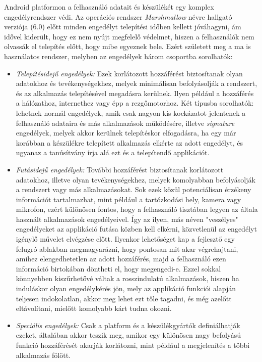 Android platformon a felhasználó adatait és készülékét egy komplex engedélyrendszer védi. Az operációs rendszer \emph{Marshmallow} névre hallgató verziója (6.0) előtt minden engedélyt telepítési időben kellett jóváhagyni, ám idővel kiderült, hogy ez nem nyújt megfelelő védelmet, hiszen a felhasználók nem olvassák el telepítés előtt, hogy mibe egyeznek bele. Ezért született meg a ma is használatos rendszer, melyben az engedélyek három csoportba sorolhatók:
\begin{itemize}
	\item \emph{Telepítésidejű engedélyek:} Ezek korlátozott hozzáférést biztosítanak olyan adatokhoz és tevékenységekhez, melyek minimálisan befolyásolják a rendszert, és az alkalmazás telepítésével megadásra kerülnek. Ilyen például a hozzáférés a hálózathoz, internethez vagy épp a rezgőmotorhoz. Két típusba sorolhatók: lehetnek normál engedélyek, amik csak nagyon kis kockázatot jelentenek a felhasználó adataira és más alkalmazások működésére, illetve \emph{signature} engedélyek, melyek akkor kerülnek telepítéskor elfogadásra, ha egy már korábban a készülékre telepített alkalmazás elkérte az adott engedélyt, és ugyanaz a tanúsítvány írja alá ezt és a telepítendő applikációt.
	\item \emph{Futásidejű engedélyek:} További hozzáférést biztosítanak korlátozott adatokhoz, illetve olyan tevékenységekhez, melyek komolyabban befolyásolják a rendszert vagy más alkalmazásokat. Sok ezek közül potenciálisan érzékeny információt tartalmazhat, mint például a tartózkodási hely, kamera vagy mikrofon, ezért különösen fontos, hogy a felhasználó tisztában legyen az általa használt alkalmazások engedélyeivel. Így az ilyen, más néven "veszélyes" engedélyeket az applikáció futása közben kell elkérni, közvetlenül az engedélyt igénylő művelet elvégzése előtt. Ilyenkor lehetőséget kap a fejlesztő egy felugró ablakban megmagyarázni, hogy pontosan mit akar végrehajtani, amihez elengedhetetlen az adott hozzáférés, majd a felhasználó ezen információ birtokában döntheti el, hogy megengedi-e. Ezzel sokkal könnyebben kiszűrhetővé váltak a rosszindulatú alkalmazások, hiszen ha induláskor olyan engedélykérés jön, mely az applikáció funkciói alapján teljesen indokolatlan, akkor meg lehet ezt tőle tagadni, és még azelőtt eltávolítani, mielőtt komolyabb kárt tudna okozni.
	\item \emph{Speciális engedélyek:} Csak a platform és a készülékgyártók definiálhatják ezeket, általában akkor teszik meg, amikor egy különösen nagy befolyású funkció hozzáférését akarják korlátozni, mint például a megjelenítés a többi alkalmazás fölött. \cite{Permissions}
\end{itemize}

